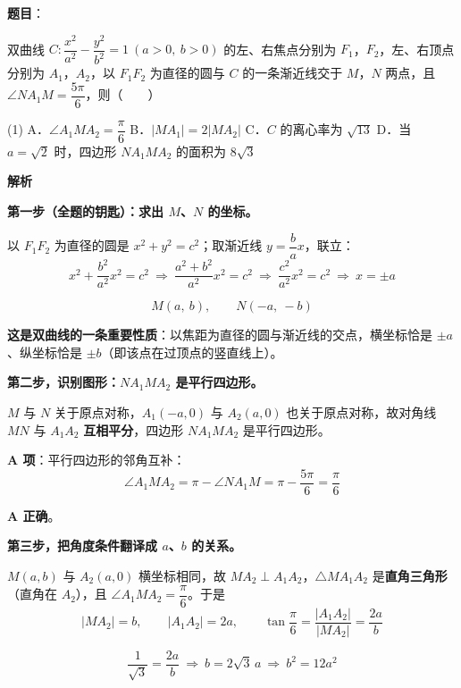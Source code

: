 \begin{answer}

\textbf{题目}：

双曲线 $C:\dfrac{x^2}{a^2}-\dfrac{y^2}{b^2}=1\ (a>0,\ b>0)$ 的左、右焦点分别为 $F_1$，$F_2$，左、右顶点分别为 $A_1$，$A_2$，以 $F_1F_2$ 为直径的圆与 $C$ 的一条渐近线交于 $M$，$N$ 两点，且 $\angle NA_1M=\dfrac{5\pi}{6}$，则\mbox{（　　）}

\begin{gkopts}(1)
\task A．$\angle A_1MA_2=\dfrac{\pi}{6}$
\task B．$|MA_1|=2|MA_2|$
\task C．$C$ 的离心率为 $\sqrt{13}$
\task D．当 $a=\sqrt2$ 时，四边形 $NA_1MA_2$ 的面积为 $8\sqrt3$
\end{gkopts}

\textbf{解析}

\textbf{第一步（全题的钥匙）：求出 $M$、$N$ 的坐标。}

以 $F_1F_2$ 为直径的圆是 $x^2+y^2=c^2$；取渐近线 $y=\dfrac bax$，联立：
\nopagebreak[4]
\[x^2+\frac{b^2}{a^2}x^2=c^2\ \Longrightarrow\ \frac{a^2+b^2}{a^2}x^2=c^2\ \Longrightarrow\ \frac{c^2}{a^2}x^2=c^2\ \Longrightarrow\ x=\pm a\]

\nopagebreak[4]
\[M(a,\ b),\qquad N(-a,\ -b)\]

\textbf{这是双曲线的一条重要性质}：以焦距为直径的圆与渐近线的交点，横坐标恰是 $\pm a$、纵坐标恰是 $\pm b$（即该点在过顶点的竖直线上）。

\textbf{第二步，识别图形：$NA_1MA_2$ 是平行四边形。}

$M$ 与 $N$ 关于原点对称，$A_1(-a,0)$ 与 $A_2(a,0)$ 也关于原点对称，故对角线 $MN$ 与 $A_1A_2$ \textbf{互相平分}，四边形 $NA_1MA_2$ 是平行四边形。

\par\medskip

\textbf{A 项}：平行四边形的邻角互补：
\nopagebreak[4]
\[\angle A_1MA_2=\pi-\angle NA_1M=\pi-\frac{5\pi}{6}=\frac\pi6\]

 \textbf{A 正确}。

\textbf{第三步，把角度条件翻译成 $a$、$b$ 的关系。}

$M(a,b)$ 与 $A_2(a,0)$ 横坐标相同，故 $MA_2\perp A_1A_2$，$\triangle MA_1A_2$ 是\textbf{直角三角形}（直角在 $A_2$），且 $\angle A_1MA_2=\dfrac\pi6$。于是
\nopagebreak[4]
\[|MA_2|=b,\qquad |A_1A_2|=2a,\qquad \tan\frac\pi6=\frac{|A_1A_2|}{|MA_2|}=\frac{2a}{b}\]

\nopagebreak[4]
\[\frac{1}{\sqrt3}=\frac{2a}{b}\ \Longrightarrow\ b=2\sqrt3\,a\ \Longrightarrow\ b^2=12a^2\]


\end{answer}
